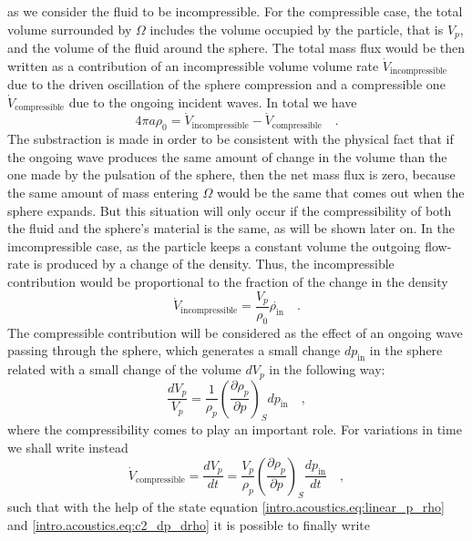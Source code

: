 as we consider the fluid to be incompressible. For the compressible case, the total volume surrounded by $\Omega$ includes the volume occupied by the particle, that is $V_p$, and the volume of the fluid around the sphere. The total mass flux would be then written as a contribution of an incompressible volume volume rate $\dot{V}_{\text{incompressible}}$ due to the driven oscillation of the sphere compression and a compressible one $\dot{V}_{\text{compressible}}$ due to the ongoing incident waves. In total we have
\begin{equation}\label{intro.arf.eq:4piarho_Vin-Vcomp}
    4\pi a \rho_0 = \dot{V}_{\text{incompressible}} - \dot{V}_{\text{compressible}}\quad.
\end{equation}
The substraction is made in order to be consistent with the physical fact that if the ongoing wave produces the same amount of change in the volume than the one made by the pulsation of the sphere, then the net mass flux is zero, because the same amount of mass entering $\Omega$ would be the same that comes out when the sphere expands. But this situation will only occur if the compressibility of both the fluid and the sphere's material is the same, as will be shown later on. In the imcompressible case, as the particle keeps a constant volume the outgoing flow-rate is produced by a change of the density. Thus, the incompressible contribution would be proportional to the fraction of the change in the density
\begin{equation}\label{intro.arf.eq:V_incomp}
    \dot{V}_{\text{incompressible}} = \frac{V_p}{\rho_0}\dot{\rho_{\text{in}}}\quad.
\end{equation}
The compressible contribution will be considered as the effect of an ongoing wave passing through the sphere, which generates a small change $d p_{\text{in}}$ in the sphere related with a small change of the volume $dV_p$ in the following way:
\begin{equation}
    \frac{dV_p}{V_p} = \frac{1}{\rho_p}\left(\frac{\partial\rho_p}{\partial p}\right)_S dp_{\text{in}}\quad,
\end{equation}
where the compressibility comes to play an important role. For variations in time we shall write instead
\begin{equation}
     \dot{V}_{\text{compressible}} = \frac{dV_p}{dt} = \frac{V_p}{\rho_p}\left(\frac{\partial\rho_p}{\partial p}\right)_S \frac{dp_{\text{in}}}{dt}\quad,
\end{equation}
such that with the help of the state equation \eqref{intro.acoustics.eq:linear_p_rho} and \eqref{intro.acoustics.eq:c2_dp_drho} it is possible to finally write
